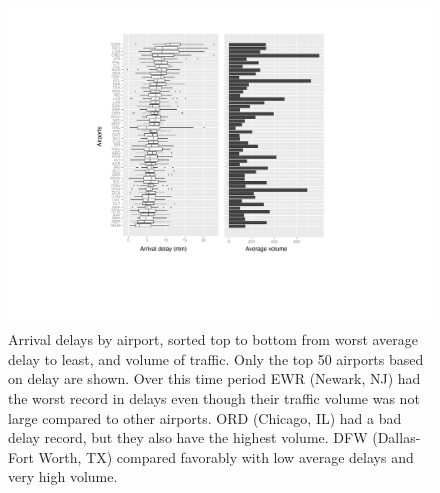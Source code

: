 \documentclass[11pt]{article}
\begin{document}
\begin{figure}[!htp]
\centerline{\includegraphics[width=5in]{images/airlines2.pdf}}
\caption{Arrival delays by airport, sorted top to bottom from worst average delay to least, and volume of traffic. Only the top 50 airports based on delay are shown. Over this time period EWR (Newark, NJ) had the worst record in delays even though their traffic volume was not large compared to other airports. ORD (Chicago, IL) had a bad delay record, but they also have the highest volume. DFW (Dallas-Fort Worth, TX) compared favorably with low average delays and very high volume.}
\label{airlines2}
\end{figure}
\end{document}
